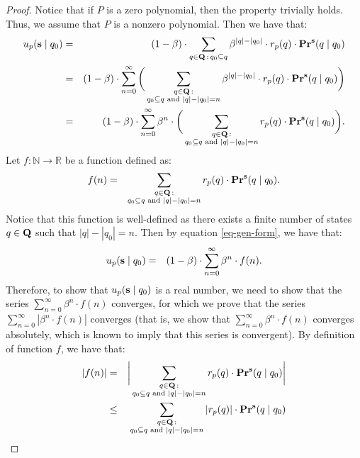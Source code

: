 \begin{proof}
Notice that if $P$ is a zero polynomial, then the property trivially holds. Thus, we assume that $P$ is a nonzero polynomial. 
Then we have that:
\begin{eqnarray}
\notag
u_p(\mathbf{s} \mid q_0) & =  & (1-\beta) \cdot \sum_{q \in \mathbf{Q} \,:\, q_0 \subseteq q} \beta^{|q|-|q_0|} \cdot  r_p(q) \cdot \mathbf{Pr}^{\mathbf{s}}(q \mid q_0)\\
\notag
& = & (1-\beta) \cdot \sum_{n=0}^\infty \bigg(\sum_{\substack{q \in \mathbf{Q} \,: \\ q_0 \subseteq q \text{ {\rm and} } |q| - |q_0| = n}} \beta^{|q|-|q_0|} \cdot  r_p(q) \cdot \mathbf{Pr}^{\mathbf{s}}(q \mid q_0)\bigg)\\
\label{eq-gen-form}
& = & (1-\beta) \cdot \sum_{n=0}^\infty \beta^n \cdot \bigg(\sum_{\substack{q \in \mathbf{Q} \,: \\ q_0 \subseteq q \text{ {\rm and} } |q| - |q_0| = n}} r_p(q) \cdot \mathbf{Pr}^{\mathbf{s}}(q \mid q_0)\bigg).
\end{eqnarray}
Let $f : \mathbb{N} \to \mathbb{R}$ be a function defined as:
\begin{eqnarray*}
f(n) & = & \sum_{\substack{q \in \mathbf{Q} \,: \\ q_0 \subseteq q \text{ {\rm and} } |q| - |q_0| = n}} r_p(q) \cdot \mathbf{Pr}^{\mathbf{s}}(q \mid q_0).
\end{eqnarray*}
Notice that this function is well-defined as there exists a finite number of states $q \in \mathbf{Q}$ such that $|q| - |q_0| = n$. Then by equation \eqref{eq-gen-form}, we have that:
\begin{eqnarray*}
u_p(\mathbf{s} \mid q_0) & = & (1-\beta) \cdot \sum_{n=0}^\infty \beta^n \cdot f(n).
\end{eqnarray*}
Therefore, to show that $u_p(\mathbf{s} \mid q_0)$ is a real number, we need to show that the series $ \sum_{n=0}^\infty \beta^n \cdot f(n)$ converges, for which we prove that the series $ \sum_{n=0}^\infty |\beta^n \cdot f(n)|$ converges (that is, we show that $ \sum_{n=0}^\infty \beta^n \cdot f(n)$ converges absolutely, which is known to imply that this series is convergent). By definition of function $f$, we have that:
\begin{eqnarray}
\notag
|f(n)| & = & \bigg| \sum_{\substack{q \in \bQ \,: \\ q_0 \subseteq q \text{ {\rm and} } |q| - |q_0| = n}} r_p(q) \cdot \pr^{\bs}(q \mid q_0) \bigg|\\
\notag
& \leq & \sum_{\substack{q \in \bQ \,: \\ q_0 \subseteq q \text{ {\rm and} } |q| - |q_0| = n}} |r_p(q)| \cdot \pr^{\bs}(q \mid q_0)\\

\end{eqnarray}
\end{proof}
